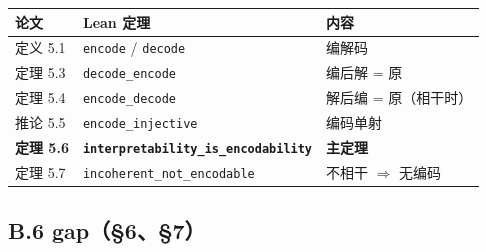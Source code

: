 \documentclass[11pt,a4paper]{ctexart}
\begin{document}
\begin{center}\small
\begin{tabular}{lll}
\toprule
论文 & Lean 定理 & 内容 \\
\midrule
定义 5.1 & \texttt{encode} / \texttt{decode} & 编解码 \\
定理 5.3 & \texttt{decode\_encode} & 编后解 = 原 \\
定理 5.4 & \texttt{encode\_decode} & 解后编 = 原（相干时） \\
推论 5.5 & \texttt{encode\_injective} & 编码单射 \\
\textbf{定理 5.6} & \textbf{\texttt{interpretability\_is\_encodability}} & \textbf{主定理} \\
定理 5.7 & \texttt{incoherent\_not\_encodable} & 不相干 \ensuremath{\Longrightarrow} 无编码 \\
\bottomrule
\end{tabular}
\end{center}

\subsection{B.6 gap（§6、§7）}
\end{document}
